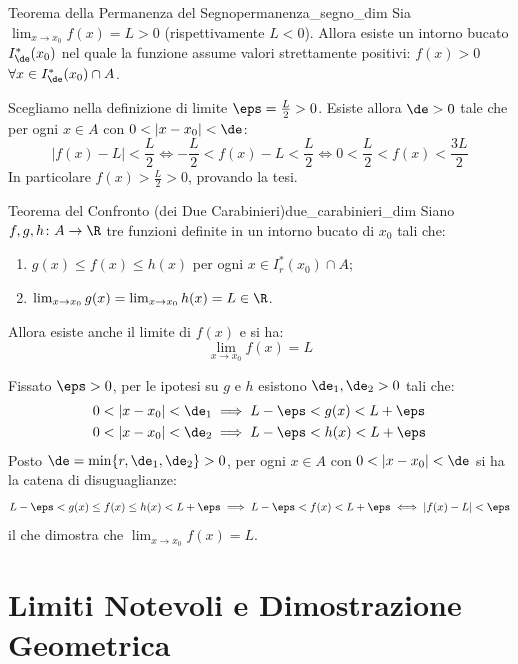 \begin{teorema}{Teorema della Permanenza del Segno}{permanenza_segno_dim}
Sia $\lim_{x \to x_0} f(x) = L > 0$ (rispettivamente $L < 0$). Allora esiste un intorno bucato $I^*_\de(x_0)$ nel quale la funzione assume valori strettamente positivi: $f(x) > 0$ $\forall x \in I^*_\de(x_0) \cap A$.
\end{teorema}

\begin{dimostrazione}
Scegliamo nella definizione di limite $\eps = \frac{L}{2} > 0$. Esiste allora $\de > 0$ tale che per ogni $x \in A$ con $0 < |x - x_0| < \de$:
\[
    |f(x) - L| < \frac{L}{2} \iff -\frac{L}{2} < f(x) - L < \frac{L}{2} \iff 0 < \frac{L}{2} < f(x) < \frac{3L}{2}
\]
In particolare $f(x) > \frac{L}{2} > 0$, provando la tesi.
\end{dimostrazione}

\begin{teorema}{Teorema del Confronto (dei Due Carabinieri)}{due_carabinieri_dim}
Siano $f, g, h \colon A \to \R$ tre funzioni definite in un intorno bucato di $x_0$ tali che:
\begin{enumerate}
    \item $g(x) \le f(x) \le h(x)$ per ogni $x \in I^*_r(x_0) \cap A$;
    \item $\lim_{x \to x_0} g(x) = \lim_{x \to x_0} h(x) = L \in \R$.
\end{enumerate}
Allora esiste anche il limite di $f(x)$ e si ha:
\[
    \lim_{x \to x_0} f(x) = L
\]
\end{teorema}

\begin{dimostrazione}
Fissato $\eps > 0$, per le ipotesi su $g$ e $h$ esistono $\de_1, \de_2 > 0$ tali che:
\begin{align*}
    0 < |x - x_0| < \de_1 &\implies L - \eps < g(x) < L + \eps \\
    0 < |x - x_0| < \de_2 &\implies L - \eps < h(x) < L + \eps
\end{align*}
Posto $\de = \min\{r, \de_1, \de_2\} > 0$, per ogni $x \in A$ con $0 < |x - x_0| < \de$ si ha la catena di disuguaglianze:
\[
    L - \eps < g(x) \le f(x) \le h(x) < L + \eps \implies L - \eps < f(x) < L + \eps \iff |f(x) - L| < \eps
\]
il che dimostra che $\lim_{x \to x_0} f(x) = L$.
\end{dimostrazione}

\section{Limiti Notevoli e Dimostrazione Geometrica}
\label{sec:limiti_notevoli_dimostrazione}

